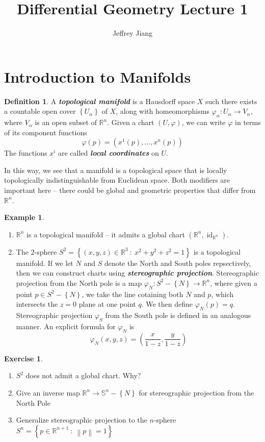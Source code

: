 \documentclass[psamsfonts]{amsart}
\theoremstyle{definition}
\newtheorem{defn}[thm]{Definition}
\newtheorem{exmp}[thm]{Example}
\newtheorem{exer}[thm]{Exercise}
\theoremstyle{remark}
\newcommand{\R}{\mathbb{R}}
\newcommand{\ib}[1]{\textbf{\textit{#1}}}
\renewcommand{\S}{\mathbb{S}}
\newcommand{\set}[1]{\left\lbrace #1 \right\rbrace}
\newcommand{\norm}[1]{\left\lVert#1\right\rVert}
\newcommand{\enumbreak}{\ \\ \vspace{-\baselineskip}}
\DeclareMathOperator{\id}{id}
\begin{document}
%
\author{Jeffrey Jiang}
%
\title{Differential Geometry Lecture 1}
%
\setcounter{section}{0}
%
\maketitle
%
\section{Introduction to Manifolds}
%
\begin{defn}
A \ib{topological manifold} is a Hausdorff space $X$ such there exists a countable open cover $\set{U_\alpha}$
of $X$, along with homeomorphisms $\varphi_\alpha : U_\alpha \to V_\alpha$, where $V_\alpha$ is an open subset
of $\R^n$. Given a chart $(U, \varphi)$, we can write $\varphi$ in terms of its component functions
$$\varphi(p) = (x^1(p), \ldots, x^n(p)) $$
The functions $x^i$ are called \ib{local coordinates} on $U$.
\end{defn}
%
In this way, we see that a manifold is a topological space that is locally topologically indistinguishable from
Euclidean space. Both modifiers are important here -- there could be global and geometric properties that
differ from $\R^n$.
%
\begin{exmp}\enumbreak
	\begin{enumerate}
		\item $\R^n$ is a topological manifold -- it admits a global chart $(\R^n, \id_{\R^n})$.
		\item The $2$-sphere $S^2 = \set{(x,y,z) \in \R^3 ~:~ x^2 + y^2 + z^2 = 1}$ is a topological
		manifold. If we let $N$ and $S$ denote the North and South poles repsectively, then we can
		construct charts using \ib{stereographic projection}. Stereographic projection from the North
		pole is a map $\varphi_N : S^2 - \set{N} \to \R^n$, where given a point $p \in S^2 - \set{N}$,
		we take the line cotaining both $N$ and $p$, which intersects the $z = 0 $ plane at one point
		$q$. We then define $\varphi_N(p) = q$. Stereographic projection $\varphi_S$ from the South
		pole is defined in an analogous manner. An explicit formula for $\varphi_N$ is
		$$\varphi_N(x,y,z) = \left(\frac{x}{1 - z}, \frac{y}{1 - z} \right) $$
	\end{enumerate}
\end{exmp}
%
\begin{exer}\enumbreak
	\begin{enumerate}
		\item $S^2$ does not admit a global chart. Why?
		\item Give an inverse map $\R^n \to \S^n - \set{N}$ for stereographic projection from the
			North Pole
		\item Generalize stereographic projection to the $n$-sphere
		$S^n = \set{p \in \R^{n+1} ~:~ \norm{p} = 1}$
	\end{enumerate}
\end{exer}
\end{document}
